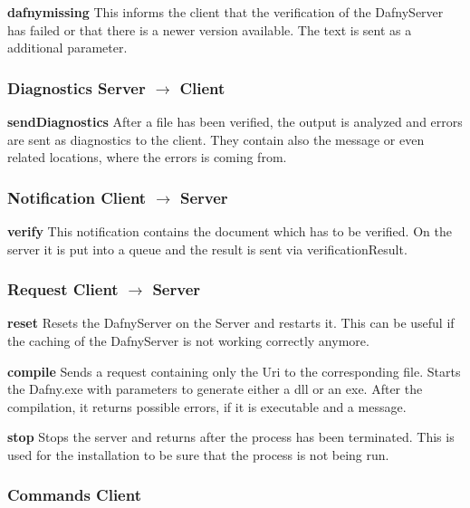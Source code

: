 \textbf{dafnymissing}
This informs the client that the verification of the DafnyServer has failed or that there is a newer version available. The text is sent as a additional parameter.  \newline

\subsubsection{Diagnostics Server $\longrightarrow$ Client}

\textbf{sendDiagnostics}
After a file has been verified, the output is analyzed and errors are sent as diagnostics to the client. They contain also the message or even related locations, where the errors is coming from.  \newline

\subsubsection{Notification Client $\longrightarrow$ Server}

\textbf{verify}
This notification contains the document which has to be verified. On the server it is put into a queue and the result is sent via verificationResult. \newline

\subsubsection{Request Client $\longrightarrow$ Server}

\textbf{reset}
Resets the DafnyServer on the Server and restarts it. This can be useful if the caching of the DafnyServer is not working correctly anymore. \newline

\textbf{compile}
Sends a request containing only the Uri to the corresponding file. Starts the Dafny.exe with parameters to generate either a dll or an exe. After the compilation, it returns possible errors, if it is executable and a message.\newline

\textbf{stop}
Stops the server and returns after the process has been terminated. This is used for the installation to be sure that the process is not being run. \newline

\subsubsection{Commands Client}

